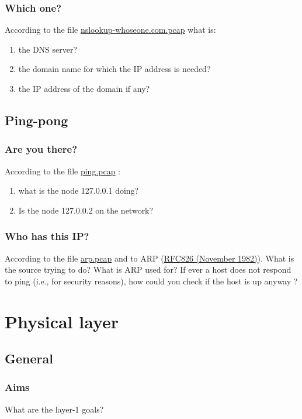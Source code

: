 \documentclass[11pt]{article}
\begin{document}
\subsubsection{Which one?}
According to the file \color{blue}\href{http://teaching.auzias.net/db/nslookup-whoseone.com.pcap}{nslookup-whoseone.com.pcap} \color{black} what is:
  \begin{enumerate}
    \item the DNS server?
    \item the domain name for which the IP address is needed?
    \item the IP address of the domain if any?
  \end{enumerate}

\subsection{Ping-pong}
\subsubsection{Are you there?}
According to the file \color{blue}\href{http://teaching.auzias.net/db/ping.pcap}{ping.pcap} \color{black}:
  \begin{enumerate}
    \item what is the node 127.0.0.1 doing?
    \item Is the node 127.0.0.2 on the network?
  \end{enumerate}
\subsubsection{Who has this IP?}
According to the file \color{blue}\href{http://teaching.auzias.net/db/arp.pcap}{arp.pcap} \color{black} and to ARP (\color{blue}\href{http://tools.ietf.org/html/rfc826}{RFC826 (November 1982)})\color{black}. What is the source trying to do? What is ARP used for? If ever a host does not respond to ping (i.e., for security reasons), how could you check if the host is up anyway ?


\section{Physical layer}
\subsection{General}
\subsubsection{Aims}
What are the layer-1 goals?
\end{document}

